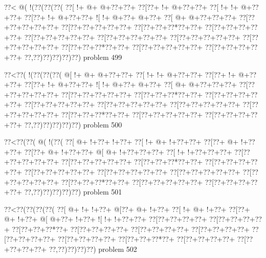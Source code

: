 \vbox{\vbox{\goo
\0??<\- @(\- !(\0??(\0??(\0??(
\0??[\- !+\- @+\- @+\0??+\0??+
\0??[\0??+\- !+\- @+\0??+\0??+
\0??[\- !+\- !+\- @+\0??+\0??+
\0??[\0??+\- !+\- @+\0??+\0??+
\- ![\- !+\- @+\0??+\- @+\0??+
\0??[\- @+\- @+\0??+\0??+\0??+
\0??[\0??+\0??+\0??+\0??+\0??+
\0??[\0??+\0??+\0??+\0??+\0??+
\0??[\0??+\0??+\0??*\0??+\0??+
\0??[\0??+\0??+\0??+\0??+\0??+
\0??[\0??+\0??+\0??+\0??+\0??+
\0??[\0??+\0??+\0??+\0??+\0??+
\0??[\0??+\0??+\0??+\0??+\0??+
\0??[\0??+\0??+\0??+\0??+\0??+
\0??[\0??+\0??+\0??*\0??+\0??+
\0??[\0??+\0??+\0??+\0??+\0??+
\0??[\0??+\0??+\0??+\0??+\0??+
\0??,\0??)\0??)\0??)\0??)\0??)
}
\hfil problem 499\hfil\break
}

\vbox{\vbox{\goo
\0??<\0??(\- !(\0??(\0??(\0??(
\- @[\- !+\- @+\- @+\0??+\0??+
\0??[\- !+\- !+\- @+\0??+\0??+
\0??[\0??+\- !+\- @+\0??+\0??+
\0??[\0??+\- !+\- @+\0??+\0??+
\- ![\- !+\- @+\0??+\- @+\0??+
\0??[\- @+\- @+\0??+\0??+\0??+
\0??[\0??+\0??+\0??+\0??+\0??+
\0??[\0??+\0??+\0??+\0??+\0??+
\0??[\0??+\0??+\0??*\0??+\0??+
\0??[\0??+\0??+\0??+\0??+\0??+
\0??[\0??+\0??+\0??+\0??+\0??+
\0??[\0??+\0??+\0??+\0??+\0??+
\0??[\0??+\0??+\0??+\0??+\0??+
\0??[\0??+\0??+\0??+\0??+\0??+
\0??[\0??+\0??+\0??*\0??+\0??+
\0??[\0??+\0??+\0??+\0??+\0??+
\0??[\0??+\0??+\0??+\0??+\0??+
\0??,\0??)\0??)\0??)\0??)\0??)
}
\hfil problem 500\hfil\break
}

\vbox{\vbox{\goo
\0??<\0??(\0??(\- @(\- !(\0??(
\0??[\- @+\- !+\0??+\- !+\0??+
\0??[\- !+\- @+\- !+\0??+\0??+
\0??[\0??+\- @+\- !+\0??+\0??+
\0??[\0??+\- @+\- !+\0??+\0??+
\- @[\- @+\- !+\0??+\0??+\0??+
\0??[\- !+\- !+\0??+\0??+\0??+
\0??[\0??+\0??+\0??+\0??+\0??+
\0??[\0??+\0??+\0??+\0??+\0??+
\0??[\0??+\0??+\0??*\0??+\0??+
\0??[\0??+\0??+\0??+\0??+\0??+
\0??[\0??+\0??+\0??+\0??+\0??+
\0??[\0??+\0??+\0??+\0??+\0??+
\0??[\0??+\0??+\0??+\0??+\0??+
\0??[\0??+\0??+\0??+\0??+\0??+
\0??[\0??+\0??+\0??*\0??+\0??+
\0??[\0??+\0??+\0??+\0??+\0??+
\0??[\0??+\0??+\0??+\0??+\0??+
\0??,\0??)\0??)\0??)\0??)\0??)
}
\hfil problem 501\hfil\break
}

\vbox{\vbox{\goo
\0??<\0??(\0??(\0??(\0??(
\0??[\- @+\- !+\- !+\0??+
\- @[\0??+\- @+\- !+\0??+
\0??[\- !+\- @+\- !+\0??+
\0??[\0??+\- @+\- !+\0??+
\- @[\- @+\0??+\- !+\0??+
\- ![\- !+\- !+\0??+\0??+
\0??[\0??+\0??+\0??+\0??+
\0??[\0??+\0??+\0??+\0??+
\0??[\0??+\0??+\0??*\0??+
\0??[\0??+\0??+\0??+\0??+
\0??[\0??+\0??+\0??+\0??+
\0??[\0??+\0??+\0??+\0??+
\0??[\0??+\0??+\0??+\0??+
\0??[\0??+\0??+\0??+\0??+
\0??[\0??+\0??+\0??*\0??+
\0??[\0??+\0??+\0??+\0??+
\0??[\0??+\0??+\0??+\0??+
\0??,\0??)\0??)\0??)\0??)
}
\hfil problem 502\hfil\break
}

